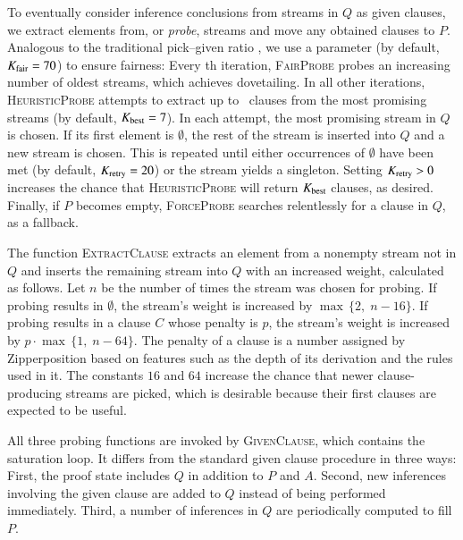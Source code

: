 To eventually consider inference conclusions from streams in $Q$ as given
clauses, we extract elements from, or \emph{probe}, streams and move any obtained
clauses to $P$. Analogous to the traditional pick--given ratio
\cite{ss-02-brainiac,mcw-1997-otter}, we use a parameter
\ParamMode{} (by default, $K_{\mathrm{fair}} = 70$) to ensure fairness: Every \ParamMode{}th iteration,
\textsc{FairProbe} probes an increasing number of oldest streams, which achieves
dovetailing. In all other iterations, \textsc{HeuristicProbe} attempts to
extract up to \ParamMaxStreams{}~clauses from the most promising streams (by default,
$K_{\mathrm{best}} = 7$).
In each attempt, the most promising stream in $Q$ is chosen. If its first
element is $\emptyset$, the rest of the stream is inserted into $Q$ and a new stream is
chosen. This is repeated until either \ParamRetry{} occurrences of $\emptyset$ have  been
met (by default, $K_{\mathrm{retry}} = 20$) or the stream yields a singleton. Setting $K_{\mathrm{retry}} > 0$ increases
the chance that \textsc{HeuristicProbe} will return $K_{\mathrm{best}}$ clauses, as desired. Finally, if $P$ becomes empty, \textsc{ForceProbe}
searches relentlessly for a clause in $Q$, as a fallback.

The function \textsc{ExtractClause} extracts an element from a nonempty stream
not in $Q$ and inserts the remaining
stream into $Q$ with an increased weight, calculated as follows.
Let $n$ be the number of times the stream was chosen for
probing. If probing results in $\emptyset$, the stream's weight is increased by
$\max\,\{2{,}\; n-16\}$. If probing results in a clause $C$ whose penalty is
$p$, the stream's weight is increased by $p \cdot \max\,\{1{,}\; n-64\}$. The
penalty of a clause is a number assigned by Zipperposition based on
features such as the depth of its derivation and the rules used in it.
The constants $16$ and $64$ increase the chance that newer clause-producing streams are picked,
which is desirable because their first clauses are expected to be useful.

All three probing functions are invoked by
\textsc{GivenClause}, which contains the saturation loop. It differs
from the standard given clause procedure in three ways:
First, the proof state includes $Q$ in addition to $P$ and $A$. Second,
new inferences involving the given clause are added to $Q$ instead of being
performed immediately. Third, a number of inferences in $Q$ are periodically computed
to fill $P$.

\newcommand\infstream[1]{[#1]}


